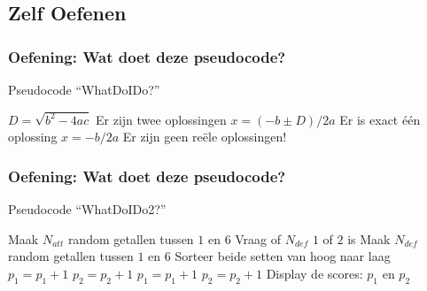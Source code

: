 \subsection{Zelf Oefenen}

\begin{frame}
\frametitle{Oefening: Wat doet deze pseudocode?}

\begin{algorithm}[H]
\caption{Pseudocode ``WhatDoIDo?''}
\begin{algorithmic}[1]
	\State $D=\sqrt{b^2-4ac}$
		\State Er zijn twee oplossingen
		\State $x = (-b\pm D) / 2a$
		\State Er is exact \'e\'en oplossing
		\State $x = -b / 2a$
	\Else {}
		\State Er zijn geen re\"ele oplossingen!
	\EndIf
\EndFunction
\end{algorithmic}
\end{algorithm}

\end{frame}




\begin{frame}
\frametitle{Oefening: Wat doet deze pseudocode?}

\begin{algorithm}[H]
\caption{Pseudocode ``WhatDoIDo2?''}
\begin{algorithmic}[1]
	\State Maak $N_{att}$ random getallen tussen $1$ en $6$
	\State Vraag of $N_{def}$ $1$ of $2$ is
	\State Maak $N_{def}$ random getallen tussen $1$ en $6$
	\State Sorteer beide setten van hoog naar laag
	  $p_1=p_1+1$
	\Else \hspace{0.4cm} $p_2=p_2+1$
	\EndIf
	  $p_1=p_1+1$
	\Else \hspace{0.4cm} $p_2=p_2+1$
	\EndIf
	\State Display de scores: $p_1$ en $p_2$
\EndFunction
\end{algorithmic}
\end{algorithm}


\end{frame}




